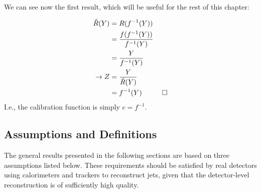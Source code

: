 We can see now the first result, which will be useful for the rest of this chapter:
\vspace{6mm}


\begin{align}
\tilde{R}(Y) &= R(f^{-1}(Y))\nonumber\\
&= \frac{f(f^{-1}(Y))}{f^{-1}(Y)}\nonumber\\
&= \frac{Y}{f^{-1}(Y)}\nonumber\\
\rightarrow Z &= \frac{Y}{\tilde{R}(Y)}\nonumber\\
&= f^{-1}(Y) \hspace{1 cm} \Box
\end{align}
I.e., the calibration function is simply $c=f^{-1}$.

\subsection{Assumptions and Definitions}
\label{sec:NI:assumptions}

The general results presented in the following sections are based on three assumptions listed below.
These requirements should be satisfied by real detectors using calorimeters and trackers to reconstruct jets, given that the detector-level reconstruction is of sufficiently high quality.

